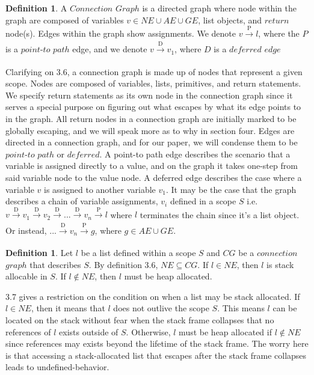 \documentclass[11pt,article]{amsart}
\theoremstyle{definition}
\newtheorem{definition}[theorem]{Definition}
\numberwithin{equation}{subsection}
\begin{document}
\begin{multicols}{2}
\begin{definition}
A $Connection$ $Graph$ is a directed graph where node within the graph are composed of variables $v \in NE \cup AE \cup GE$, list objects, and $return$ node(s). Edges within the graph show assignments. We denote $v \xrightarrow[]{\text{P}} l$, where the $P$ is a $point$-$to$ $path$ edge, and we denote $v \xrightarrow[]{\text{D}} v_1$, where $D$ is a $deferred$ $edge$
\end{definition}
Clarifying on 3.6, a connection graph is made up of nodes that represent a given scope. Nodes are composed of variables, lists, primitives, and return statements. We specify return statements as its own node in the connection graph since it serves a special purpose on figuring out what escapes by what its edge points to in the graph. All return nodes in a connection graph are initially marked to be globally escaping, and we will speak more as to why in section four. Edges are directed in a connection graph, and for our paper, we will condense them to be $point$-$to$ $path$ or $deferred$. A point-to path edge describes the scenario that a variable is assigned directly to a value, and on the graph it takes one-step from said variable node to the value node. A deferred edge describes the case where a variable $v$ is assigned to another variable $v_1$. It may be the case that the graph describes a chain of variable assignments, $v_i$ defined in a scope $S$ i.e. $v \xrightarrow[]{\text{D}} v_1 \xrightarrow[]{\text{D}} v_2 \xrightarrow[]{\text{D}} ... \xrightarrow[]{\text{D}} v_n \xrightarrow[]{\text{P}} l$ where $l$ terminates the chain since it's a list object. Or instead, .$.. \xrightarrow[]{\text{D}} v_n \xrightarrow[]{\text{P}} g$, where $g\in AE \cup GE$.

\begin{definition}
Let $l$ be a list defined within a scope $S$ and $CG$ be a $connection$ $graph$ that describes $S$. By definition 3.6, $NE \subseteq CG$. If $l \in NE$, then $l$ is stack allocable in $S$. If $l \notin NE$, then $l$ must be heap allocated. 
\end{definition}
3.7 gives a restriction on the condition on when a list may be stack allocated. If $l \in NE$, then it means that $l$ does not outlive the scope $S$. This means $l$ can be located on the stack without fear when the stack frame collapses that no references of $l$ exists outside of $S$. Otherwise, $l$ must be heap allocated if $l \notin NE$ since references may exists beyond the lifetime of the stack frame. The worry here is that accessing a stack-allocated list that escapes after the stack frame collapses leads to undefined-behavior. 

\end{multicols}
\end{document}
